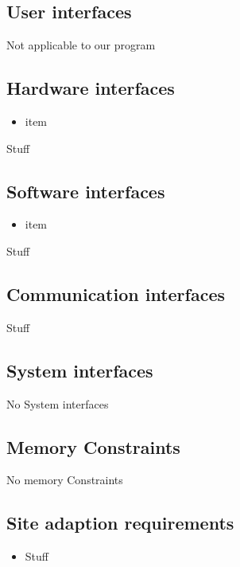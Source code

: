 \subsection{User interfaces}
    Not applicable to our program

\subsection{Hardware interfaces}
    \begin{itemize}
        \item item
    \end{itemize}
    Stuff

\subsection{Software interfaces}
    \begin{itemize}
        \item item
    \end{itemize}
    Stuff

\subsection{Communication interfaces}
    Stuff

\subsection{System interfaces}
    No System interfaces

\subsection{Memory Constraints}
    No memory Constraints

\subsection{Site adaption requirements}
    \begin{itemize}
        \item Stuff
    \end{itemize}